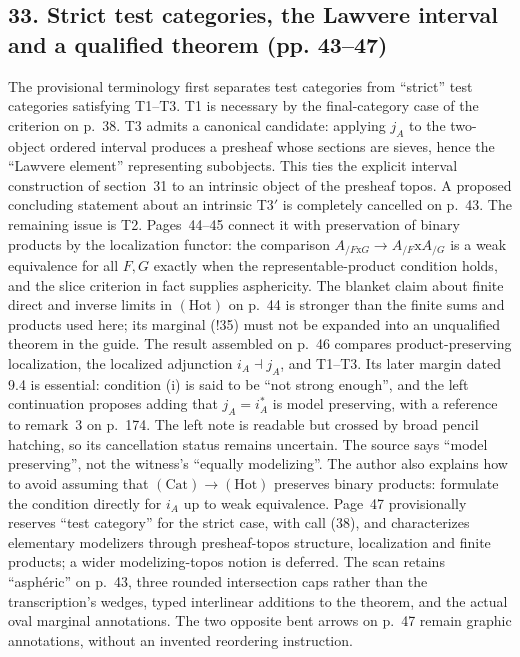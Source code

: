 \documentclass[10pt,oneside]{book}
\begin{document}
\subsection*{33. Strict test categories, the Lawvere interval and a qualified theorem (pp. 43--47)}
The provisional terminology first separates test categories from ``strict'' test categories satisfying T1--T3. T1 is necessary by the final-category case of the criterion on p.~38. T3 admits a canonical candidate: applying $j_A$ to the two-object ordered interval produces a presheaf whose sections are sieves, hence the ``Lawvere element'' representing subobjects. This ties the explicit interval construction of section~31 to an intrinsic object of the presheaf topos. A proposed concluding statement about an intrinsic T3$'$ is completely cancelled on p.~43. The remaining issue is T2. Pages~44--45 connect it with preservation of binary products by the localization functor: the comparison $A_{/F\mathrm{x}G}\to A_{/F}\mathrm{x}A_{/G}$ is a weak equivalence for all $F,G$ exactly when the representable-product condition holds, and the slice criterion in fact supplies asphericity. The blanket claim about finite direct and inverse limits in $(\mathrm{Hot})$ on p.~44 is stronger than the finite sums and products used here; its marginal (!35) must not be expanded into an unqualified theorem in the guide. The result assembled on p.~46 compares product-preserving localization, the localized adjunction $i_A\dashv j_A$, and T1--T3. Its later margin dated 9.4 is essential: condition (i) is said to be ``not strong enough'', and the left continuation proposes adding that $j_A=i_A^*$ is model preserving, with a reference to remark~3 on p.~174. The left note is readable but crossed by broad pencil hatching, so its cancellation status remains uncertain. The source says ``model preserving'', not the witness's ``equally modelizing''. The author also explains how to avoid assuming that $(\mathrm{Cat})\to(\mathrm{Hot})$ preserves binary products: formulate the condition directly for $i_A$ up to weak equivalence. Page~47 provisionally reserves ``test category'' for the strict case, with call (38), and characterizes elementary modelizers through presheaf-topos structure, localization and finite products; a wider modelizing-topos notion is deferred. The scan retains ``asphéric'' on p.~43, three rounded intersection caps rather than the transcription's wedges, typed interlinear additions to the theorem, and the actual oval marginal annotations. The two opposite bent arrows on p.~47 remain graphic annotations, without an invented reordering instruction.
\end{document}
